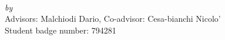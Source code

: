 \begin{titlepage}
  \vspace*{5cm}
  \makeatletter
  \begin{center}
    \begin{Huge}
      \@title
    \end{Huge}\\[0.1cm]
    \emph{by}\\
    \@author
    \vfill
    Advisors: Malchiodi Dario, Co-advisor: Cesa-bianchi Nicolo'\\
    Student badge number: 794281
  \end{center}
  \makeatother
\end{titlepage}

\newpage
\null
\thispagestyle{empty}
\newpage
